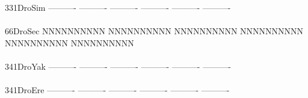 \documentclass[11pt,twoside,reqno,a4paper]{article}
\begin{document}
{331\hspace*{1\charwidth}DroSim	----------	----------	----------	----------	----------	----------	\\
\hspace*{4\charwidth}\hspace*{7\charwidth}\hspace*{1\charwidth}\hspace*{1\charwidth}\hspace*{1\charwidth}\hspace*{1\charwidth}\hspace*{1\charwidth}\hspace*{1\charwidth}\\
66\hspace*{2\charwidth}DroSec	NNNNNNNNNN	NNNNNNNNNN	NNNNNNNNNN	NNNNNNNNNN	NNNNNNNNNN	NNNNNNNNNN	\\
\hspace*{4\charwidth}\hspace*{7\charwidth}\hspace*{1\charwidth}\hspace*{1\charwidth}\hspace*{1\charwidth}\hspace*{1\charwidth}\hspace*{1\charwidth}\hspace*{1\charwidth}\\
341\hspace*{1\charwidth}DroYak	----------	----------	----------	----------	----------	----------	\\
\hspace*{4\charwidth}\hspace*{7\charwidth}\hspace*{1\charwidth}\hspace*{1\charwidth}\hspace*{1\charwidth}\hspace*{1\charwidth}\hspace*{1\charwidth}\hspace*{1\charwidth}\\
341\hspace*{1\charwidth}DroEre	----------	----------	----------	----------	----------	----------	\\
\hspace*{4\charwidth}\hspace*{7\charwidth}\hspace*{1\charwidth}\hspace*{1\charwidth}\hspace*{1\charwidth}\hspace*{1\charwidth}\hspace*{1\charwidth}\hspace*{1\charwidth}\\
}
\end{document}

